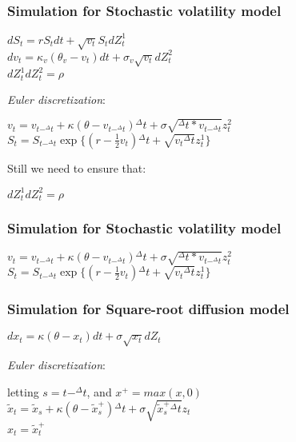 \documentclass{beamer}
\begin{document}
\begin{frame}
\frametitle{Simulation for Stochastic volatility model}
\begin{center}
	$dS_{t} = rS_{t}dt + \sqrt{v_{t}}S_{t}dZ_{t}^{1}$\\[3mm]
	$dv_{t} = \kappa_{v}(\theta_{v}-v_{t})dt + \sigma_{v}\sqrt{v_{t}}dZ_{t}^{2}$\\[3mm]
	$dZ_{t}^{1}dZ_{t}^{2} = \rho $
\end{center}
\emph{Euler discretization}:
\begin{center}
	$v_{t} = v_{t-^{\Delta}t} + \kappa(\theta-v_{t-^{\Delta}t}){^{\Delta}t} + \sigma\sqrt{^{\Delta}t*v_{t-^{\Delta}t}}z_{t}^{2}$\\[3mm]
	$S_{t} = S_{t-^{\Delta}t} \exp\{(r-\frac{1}{2}v_{t}){^{\Delta}t}+\sqrt{v_{t}{^{\Delta}t}}z_{t}^{1}\}$
\end{center}
Still we need to ensure that:
\begin{center}
	$dZ_{t}^{1}dZ_{t}^{2} = \rho $
\end{center}
\end{frame}

\begin{frame}
\frametitle{Simulation for Stochastic volatility model}
\begin{center}
	$v_{t} = v_{t-^{\Delta}t} + \kappa(\theta-v_{t-^{\Delta}t}){^{\Delta}t} + \sigma\sqrt{^{\Delta}t*v_{t-^{\Delta}t}}z_{t}^{2}$
	$S_{t} = S_{t-^{\Delta}t} \exp\{(r-\frac{1}{2}v_{t}){^{\Delta}t}+\sqrt{v_{t}{^{\Delta}t}}z_{t}^{1}\}$
\end{center}
\end{frame}

\begin{frame}
\frametitle{Simulation for Square-root diffusion model}
\begin{center}
	$dx_{t} = \kappa(\theta-x_{t})dt + \sigma\sqrt{x_{t}}dZ_{t}$
\end{center}
\emph{Euler discretization}:
\begin{center}
	letting $s = t-^{\Delta}t$, and $x^{+} = max(x,0)$\\[3mm]
	$\tilde{x}_{t} = \tilde{x}_{s} + \kappa(\theta-\tilde{x}_{s}^{+}){^{\Delta}t} + \sigma\sqrt{\tilde{x}_{s}^{+}{^{\Delta}t}}z_{t}$\\[3mm]
	$x_{t} = \tilde{x}_{t}^{+}$
\end{center}
\end{frame}
\end{document}
